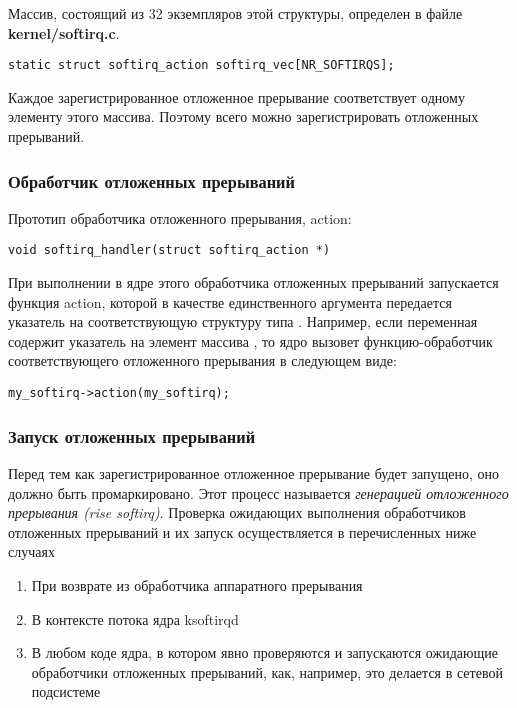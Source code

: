 Массив, состоящий из 32 экземпляров этой структуры, определен в файле \textbf{kernel/softirq.c}.
\begin{lstlisting}
static struct softirq_action softirq_vec[NR_SOFTIRQS];
\end{lstlisting}
Каждое зарегистрированное отложенное прерывание соответствует одному элементу этого массива. Поэтому всего можно зарегистрировать  отложенных прерываний.

\subsubsection{Обработчик отложенных прерываний}
Прототип обработчика отложенного прерывания, action:
\begin{lstlisting}
void softirq_handler(struct softirq_action *)
\end{lstlisting}

При выполнении в ядре этого обработчика отложенных прерываний запускается функция action, которой в качестве единственного аргумента передается указатель на соответствующую структуру типа . Например, если переменная  содержит указатель на элемент массива , то ядро вызовет функцию-обработчик соответствующего отложенного прерывания в следующем виде:
\begin{lstlisting}
my_softirq->action(my_softirq);
\end{lstlisting}

\subsubsection{Запуск отложенных прерываний}

Перед тем как зарегистрированное отложенное прерывание будет запущено, оно должно быть промаркировано. Этот процесс называется \textit{генерацией отложенного прерывания (rise softirq)}.
Проверка ожидающих выполнения обработчиков отложенных прерываний и их запуск осуществляется в перечисленных ниже случаях
\begin{enumerate}
    \item При возврате из обработчика аппаратного прерывания
    \item В контексте потока ядра ksoftirqd
    \item В любом коде ядра, в котором явно проверяются и запускаются ожидающие обработчики отложенных прерываний, как, например, это делается в сетевой подсистеме
\end{enumerate}

